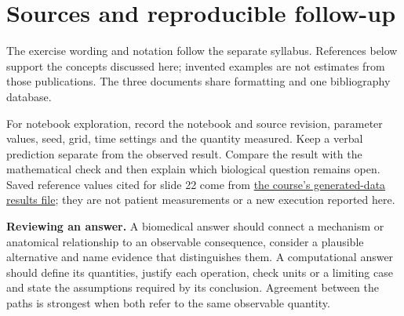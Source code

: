 \documentclass[11pt,a4paper]{article}
\newcommand{\currentsolutionheading}{Tentative syllabus solutions}
\begin{document}
\section*{Sources and reproducible follow-up}
The exercise wording and notation follow the separate syllabus. References below support the concepts discussed here; invented examples are not estimates from those publications. The three documents share formatting and one bibliography database.

For notebook exploration, record the notebook and source revision, parameter values, seed, grid, time settings and the quantity measured. Keep a verbal prediction separate from the observed result. Compare the result with the mathematical check and then explain which biological question remains open. Saved reference values cited for slide 22 come from \href{https://github.com/arvidl/brains-to-models/blob/main/paper/figures/growth_extension_values.json}{the course's generated-data results file}; they are not patient measurements or a new execution reported here.

\textbf{Reviewing an answer.} A biomedical answer should connect a mechanism or anatomical relationship to an observable consequence, consider a plausible alternative and name evidence that distinguishes them. A computational answer should define its quantities, justify each operation, check units or a limiting case and state the assumptions required by its conclusion. Agreement between the paths is strongest when both refer to the same observable quantity.

\clearpage{}
\gdef\currentsolutionheading{References}

\end{document}
